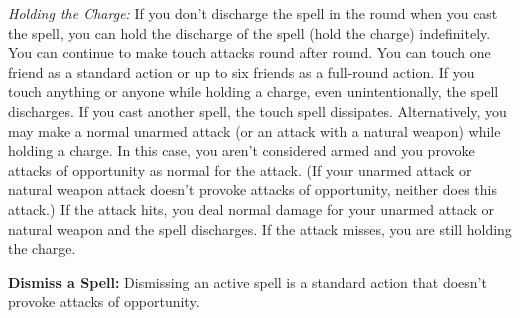 \textit{Holding the Charge:} If you don't discharge the spell in the round when you cast the spell, you can hold the discharge of the spell (hold the charge) indefinitely. You can continue to make touch attacks round after round. You can touch one friend as a standard action or up to six friends as a full-round action. If you touch anything or anyone while holding a charge, even unintentionally, the spell discharges. If you cast another spell, the touch spell dissipates. Alternatively, you may make a normal unarmed attack (or an attack with a natural weapon) while holding a charge. In this case, you aren't considered armed and you provoke attacks of opportunity as normal for the attack. (If your unarmed attack or natural weapon attack doesn't provoke attacks of opportunity, neither does this attack.) If the attack hits, you deal normal damage for your unarmed attack or natural weapon and the spell discharges. If the attack misses, you are still holding the charge.

\textbf{Dismiss a Spell:} Dismissing an active spell is a standard action that doesn't provoke attacks of opportunity.